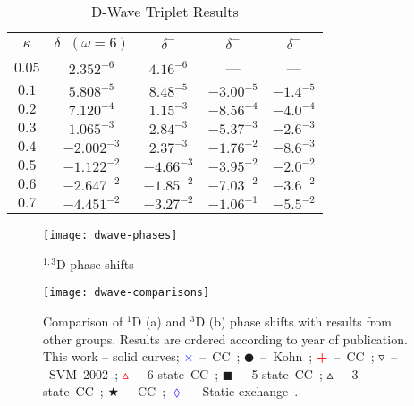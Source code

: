 \documentclass[Dissertation.tex]{subfiles}
\begin{document}
\begin{table}[H]
\centering
\begin{tabular}{|c|c|c|c|c|}
\hline
$\kappa$ & $\delta^- (\omega = 6)$ & $\delta^-$ \cite{Blackwood2002} & $\delta^-$ \cite{Ray1997} & $\delta^-$ \cite{Adhikari1999} \\
\hline
$0.05$ & $2.352^{-6}$ & $4.16^{-6}$ & --- & --- \\
$0.1$ & $5.808^{-5}$ & $8.48^{-5}$ & $-3.00^{-5}$ & $-1.4^{-5}$ \\
$0.2$ & $7.120^{-4}$ & $1.15^{-3}$ & $-8.56^{-4}$ & $-4.0^{-4}$ \\
$0.3$ & $1.065^{-3}$ & $2.84^{-3}$ & $-5.37^{-3}$ & $-2.6^{-3}$ \\
$0.4$ & $-2.002^{-3}$ & $2.37^{-3}$ & $-1.76^{-2}$ & $-8.6^{-3}$ \\
$0.5$ & $-1.122^{-2}$ & $-4.66^{-3}$ & $-3.95^{-2}$ & $-2.0^{-2}$ \\
$0.6$ & $-2.647^{-2}$ & $-1.85^{-2}$ & $-7.03^{-2}$ & $-3.6^{-2}$ \\
$0.7$ & $-4.451^{-2}$ & $-3.27^{-2}$ & $-1.06^{-1}$ & $-5.5^{-2}$ \\
\hline
\end{tabular}
\caption{D-Wave Triplet Results}
\label{tab:DWaveTriplet}
\end{table}


\begin{figure}[H]
	\centering
	\texttt{[image: dwave-phases]}
	\caption{$^{1,3}$D phase shifts}
	\label{fig:DWavePhase}
\end{figure}


\begin{figure}[H]
	\centering
	\texttt{[image: dwave-comparisons]}
	\caption[Comparison of D-wave phase shifts]{Comparison of $^1$D (a) and $^3$D (b) phase shifts with results from other groups. Results are ordered according to year of publication. This work -- solid curves; \mbox{\textcolor{blue}{$\times$} -- CC \cite{Walters2004};} \mbox{$\CIRCLE$ -- Kohn \cite{VanReeth2003};} \mbox{\textcolor{red}{\textbf{+}} -- CC \cite{Blackwood2002};} \mbox{$\triangledown$ -- SVM 2002 \cite{Ivanov2002};} \mbox{\textcolor{red}{$\vartriangle$} -- 6-state CC \cite{Sinha2000};} \mbox{$\blacksquare$ -- 5-state CC \cite{Adhikari1999};} \mbox{$\vartriangle$ -- 3-state CC \cite{Sinha1997};} \mbox{\textcolor[RGB]{0,127,0}{$\bigstar$} -- CC \cite{Ray1997};} \mbox{\textcolor{blue}{$\lozenge$} -- Static-exchange \cite{Hara1975}.}}
	\label{fig:DWaveComparisons}
\end{figure}
\end{document}
